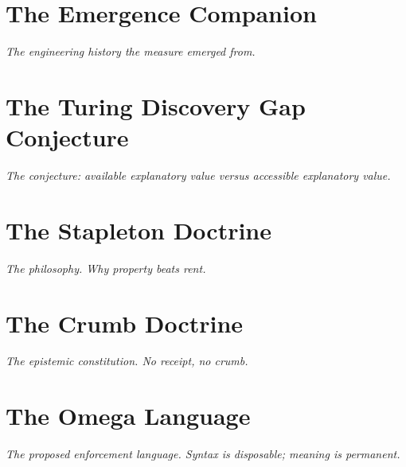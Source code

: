 \documentclass[11pt,letterpaper]{article}
\begin{document}
\section*{The Emergence Companion}
\begin{center}\textit{The engineering history the measure emerged from.}\end{center}
\newpage


\section*{The Turing Discovery Gap Conjecture}
\begin{center}\textit{The conjecture: available explanatory value versus accessible explanatory value.}\end{center}
\newpage


\section*{The Stapleton Doctrine}
\begin{center}\textit{The philosophy. Why property beats rent.}\end{center}
\newpage


\section*{The Crumb Doctrine}
\begin{center}\textit{The epistemic constitution. No receipt, no crumb.}\end{center}
\newpage


\section*{The Omega Language}
\begin{center}\textit{The proposed enforcement language. Syntax is disposable; meaning is permanent.}\end{center}
\newpage

\end{document}
